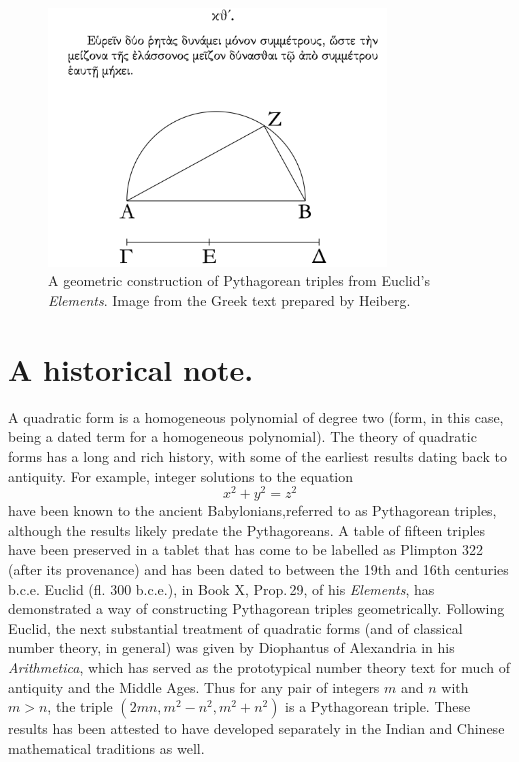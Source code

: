 \begin{figure}
    \centering
    \includegraphics[width=0.8\textwidth]{assets/euclid.png}
    \caption[A geometric construction of Pythagorean triples.]{A geometric construction of Pythagorean triples from Euclid's \emph{Elements}. Image from the Greek text prepared by Heiberg. \cite{heiberg1885euclid}}
    \label{fig:pythagorean-triples}
\end{figure}

\section*{A historical note.}


A quadratic form is a homogeneous polynomial of degree two (form, in this case, being a dated term for a homogeneous polynomial). The theory of quadratic forms has a long and rich history, with some of the earliest results dating back to antiquity. For example, integer solutions to the equation
\[
    x^2 + y^2 = z^2 
\]
have been known to the ancient Babylonians,referred to as Pythagorean triples, although the results likely predate the Pythagoreans. A table of fifteen triples have been preserved in a tablet that has come to be labelled as Plimpton 322 (after its provenance) and has been dated to between the 19th and 16th centuries {\sc b.c.e.} \cite{robson2002words} Euclid (fl. 300 {\sc b.c.e.}), in Book X, Prop.\,29, of his \emph{Elements}, has demonstrated a way of constructing Pythagorean triples geometrically. \cite{euclid1956elements} Following Euclid, the next substantial treatment of quadratic forms (and of classical number theory, in general) was given by Diophantus of Alexandria in his \emph{Arithmetica}, which has served as the prototypical number theory text for much of antiquity and the Middle Ages. \cite{katz2009history} Thus for any pair of integers \(m\) and \(n\) with \(m > n\), the triple
\(
    (2mn, m^2 - n^2, m^2 + n^2)
\)
is a Pythagorean triple. These results has been attested to have developed separately in the Indian and Chinese mathematical traditions as well. \cite{weil1984number}

